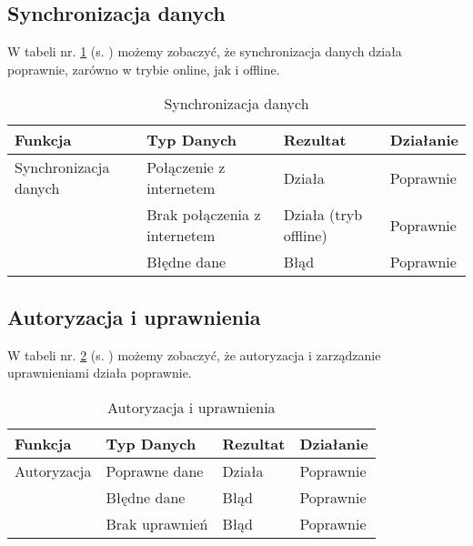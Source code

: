 \subsection{Synchronizacja danych}
W tabeli nr. \ref{tab:tabelka009} (s. \pageref{tab:tabelka009}) możemy zobaczyć, że synchronizacja danych działa poprawnie, zarówno w trybie online, jak i offline.
\begin{table}[h!]
	\centering
	\begin{tabularx}{\textwidth}{|X|>{\arraybackslash}m{}|X|X|}
		\hline
		\textbf{Funkcja}      & \textbf{Typ Danych}          & \textbf{Rezultat}     & \textbf{Działanie} \\ \hline
		Synchronizacja danych & Połączenie z internetem      & Działa                & Poprawnie          \\ \hline
		                      & Brak połączenia z internetem & Działa (tryb offline) & Poprawnie          \\ \hline
		                      & Błędne dane                  & Błąd                  & Poprawnie          \\ \hline
	\end{tabularx}
	\caption{Synchronizacja danych}
	\label{tab:tabelka009}
\end{table}

\subsection{Autoryzacja i uprawnienia}
W tabeli nr. \ref{tab:tabelka010} (s. \pageref{tab:tabelka010}) możemy zobaczyć, że autoryzacja i zarządzanie uprawnieniami działa poprawnie.
\begin{table}[h!]
	\centering
	\begin{tabularx}{\textwidth}{|X|>{\arraybackslash}m{}|X|X|}
		\hline
		\textbf{Funkcja} & \textbf{Typ Danych} & \textbf{Rezultat} & \textbf{Działanie} \\ \hline
		Autoryzacja      & Poprawne dane       & Działa            & Poprawnie          \\ \hline
		                 & Błędne dane         & Błąd              & Poprawnie          \\ \hline
		                 & Brak uprawnień      & Błąd              & Poprawnie          \\ \hline
	\end{tabularx}
	\caption{Autoryzacja i uprawnienia}
	\label{tab:tabelka010}
\end{table}
\newpage
